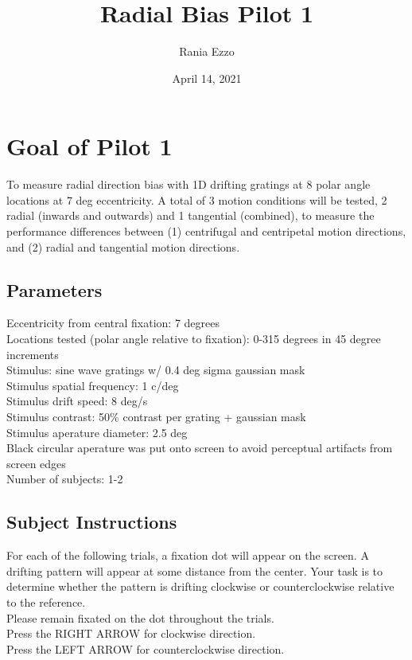 \documentclass[11pt]{article} %
\title{Radial Bias Pilot 1}
\date{April 14, 2021}
\author{Rania Ezzo}
\begin{document}
\maketitle
\tableofcontents


\section{Goal of Pilot 1}
To measure radial direction bias with 1D drifting gratings at 8 polar angle locations at 7 deg eccentricity. A total of 3 motion conditions will be tested, 2 radial (inwards and outwards) and 1 tangential (combined), to measure the performance differences between (1) centrifugal and centripetal motion directions, and (2) radial and tangential motion directions. 

\subsection{Parameters}
Eccentricity from central fixation: 7 degrees
\\
Locations tested (polar angle relative to fixation): 0-315 degrees in 45 degree increments
\\
Stimulus: sine wave gratings w/ 0.4 deg sigma gaussian mask
\\
Stimulus spatial frequency: 1 c/deg
\\
Stimulus drift speed: 8 deg/s
\\
Stimulus contrast: 50\% contrast per grating + gaussian mask
\\
Stimulus aperature diameter: 2.5 deg
\\
Black circular aperature was put onto screen to avoid perceptual artifacts from screen edges
\\
Number of subjects: 1-2

\subsection{Subject Instructions}
For each of the following trials, a fixation dot will appear on the screen. A drifting pattern will appear at some distance from the center. Your task is to determine whether the pattern is drifting clockwise or counterclockwise relative to the reference.
\\
Please remain fixated on the dot throughout the trials.
\\
Press the RIGHT ARROW for clockwise direction.
\\
Press the LEFT ARROW for counterclockwise direction.
\end{document}

